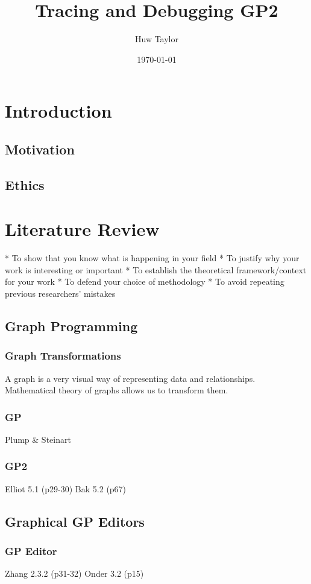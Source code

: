 \documentclass{UoYCSproject}
\author{Huw Taylor}
\title{Tracing and Debugging GP2}
\date{\today}
\begin{document}
\maketitle
\tableofcontents
\listoffigures

\chapter{Introduction}
\section{Motivation}
\section{Ethics}

\chapter{Literature Review}
 * To show that you know what is happening in your field 
 * To justify why your work is interesting or important 
 * To establish the theoretical framework/context for your work 
 * To defend your choice of methodology 
 * To avoid repeating previous researchers’ mistakes
\section{Graph Programming}
\subsection{Graph Transformations}
A graph is a very visual way of representing data and relationships. 
Mathematical theory of graphs allows us to transform them.
\subsection{GP}
Plump & Steinart
\subsection{GP2}
Elliot 5.1 (p29-30)
Bak 5.2 (p67)
\section{Graphical GP Editors}

\subsection{GP Editor}
Zhang 2.3.2 (p31-32)
Onder 3.2 (p15)
\end{document}

